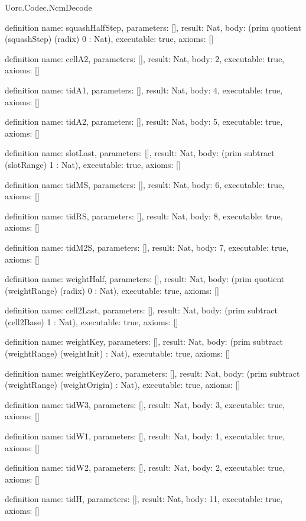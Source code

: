 \begin{lexlean}{Uorc.Codec.NcmDecode}
\begin{semanticmodule}
definition{
  name: squashHalfStep,
  parameters: [],
  result: Nat,
  body: (prim quotient (squashStep) (radix) 0 : Nat),
  executable: true,
  axioms: []
}

definition{
  name: cellA2,
  parameters: [],
  result: Nat,
  body: 2,
  executable: true,
  axioms: []
}

definition{
  name: tidA1,
  parameters: [],
  result: Nat,
  body: 4,
  executable: true,
  axioms: []
}

definition{
  name: tidA2,
  parameters: [],
  result: Nat,
  body: 5,
  executable: true,
  axioms: []
}

definition{
  name: slotLast,
  parameters: [],
  result: Nat,
  body: (prim subtract (slotRange) 1 : Nat),
  executable: true,
  axioms: []
}

definition{
  name: tidMS,
  parameters: [],
  result: Nat,
  body: 6,
  executable: true,
  axioms: []
}

definition{
  name: tidRS,
  parameters: [],
  result: Nat,
  body: 8,
  executable: true,
  axioms: []
}

definition{
  name: tidM2S,
  parameters: [],
  result: Nat,
  body: 7,
  executable: true,
  axioms: []
}

definition{
  name: weightHalf,
  parameters: [],
  result: Nat,
  body: (prim quotient (weightRange) (radix) 0 : Nat),
  executable: true,
  axioms: []
}

definition{
  name: cell2Last,
  parameters: [],
  result: Nat,
  body: (prim subtract (cell2Base) 1 : Nat),
  executable: true,
  axioms: []
}

definition{
  name: weightKey,
  parameters: [],
  result: Nat,
  body: (prim subtract (weightRange) (weightInit) : Nat),
  executable: true,
  axioms: []
}

definition{
  name: weightKeyZero,
  parameters: [],
  result: Nat,
  body: (prim subtract (weightRange) (weightOrigin) : Nat),
  executable: true,
  axioms: []
}

definition{
  name: tidW3,
  parameters: [],
  result: Nat,
  body: 3,
  executable: true,
  axioms: []
}

definition{
  name: tidW1,
  parameters: [],
  result: Nat,
  body: 1,
  executable: true,
  axioms: []
}

definition{
  name: tidW2,
  parameters: [],
  result: Nat,
  body: 2,
  executable: true,
  axioms: []
}

definition{
  name: tidH,
  parameters: [],
  result: Nat,
  body: 11,
  executable: true,
  axioms: []
}


\end{semanticmodule}
\end{lexlean}

